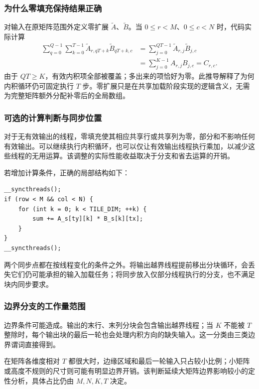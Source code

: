 \subsubsection{为什么零填充保持结果正确}
对输入在原矩阵范围外定义零扩展 $\widetilde A$、$\widetilde B$。当 $0\le r<M$、$0\le c<N$ 时，代码实际计算
\begin{align}
 \sum_{q=0}^{Q-1}\sum_{k=0}^{T-1}
 \widetilde A_{r,qT+k}\widetilde B_{qT+k,c}
 &=\sum_{j=0}^{QT-1}\widetilde A_{r,j}\widetilde B_{j,c}\\
 &=\sum_{j=0}^{K-1}A_{r,j}B_{j,c}=C_{r,c}.
\end{align}
由于 $QT\ge K$，有效内积项全部被覆盖；多出来的项恰好为零。此推导解释了为何内积循环仍可固定执行 $T$ 步。零扩展只是在共享加载阶段实现的逻辑含义，无需为完整矩阵额外分配补零后的全局数组。

\subsubsection{可选的计算判断与同步位置}
对于无有效输出的线程，零填充使其相应共享行或共享列为零，部分和不影响任何有效输出。可以继续执行内积循环，也可以仅让有效输出线程执行乘加，以减少这些线程的无用运算。该调整的实际性能收益取决于分支和省去运算的开销。

\par\noindent\begin{minipage}{\linewidth}
若增加计算条件，正确的局部结构如下：

\begin{lstlisting}[numbers=none]
__syncthreads();
if (row < M && col < N) {
    for (int k = 0; k < TILE_DIM; ++k) {
        sum += A_s[ty][k] * B_s[k][tx];
    }
}
__syncthreads();
\end{lstlisting}
\end{minipage}\par
两个同步点都在按线程变化的条件之外。将输出越界线程提前移出分块循环，会丢失它们仍可能承担的输入加载任务；将同步放入仅部分线程执行的分支，也不满足块内同步要求。

\subsubsection{边界分支的工作量范围}
边界条件可能造成。输出的末行、末列分块会包含输出越界线程；当 $K$ 不能被 $T$ 整除时，每个输出块的最后一轮也会处理内积方向的缺失输入。这一分类由三类边界谓词直接得到。

在矩阵各维度相对 $T$ 都很大时，边缘区域和最后一轮输入只占较小比例；小矩阵或高度不规则的尺寸则可能有明显边界开销。该判断延续大矩阵边界影响较小的定性分析，具体占比仍由 $M,N,K,T$ 决定。
\FloatBarrier
